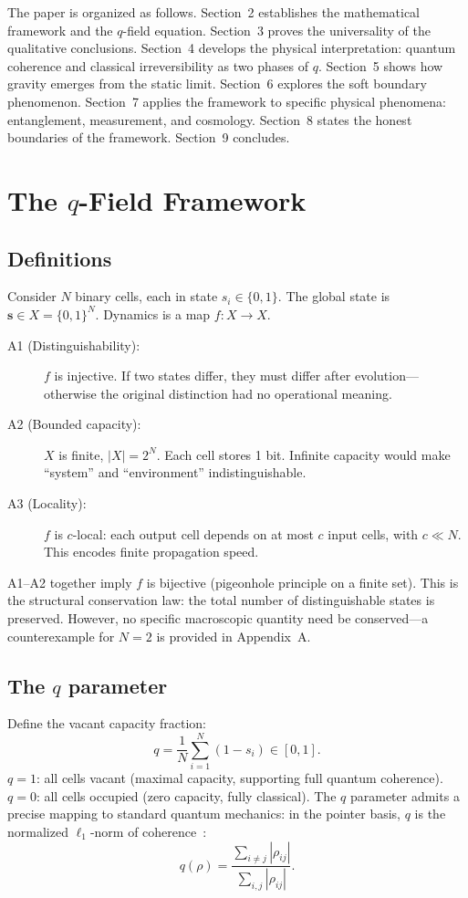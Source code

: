 \documentclass[12pt]{article}
\begin{document}
The paper is organized as follows. Section~2 establishes the mathematical framework and the $q$-field equation. Section~3 proves the universality of the qualitative conclusions. Section~4 develops the physical interpretation: quantum coherence and classical irreversibility as two phases of $q$. Section~5 shows how gravity emerges from the static limit. Section~6 explores the soft boundary phenomenon. Section~7 applies the framework to specific physical phenomena: entanglement, measurement, and cosmology. Section~8 states the honest boundaries of the framework. Section~9 concludes.

\section{The $q$-Field Framework}

\subsection{Definitions}

Consider $N$ binary cells, each in state $s_i\in\{0,1\}$. The global state is $\mathbf{s}\in X=\{0,1\}^N$. Dynamics is a map $f:X\to X$.

\begin{description}
\item[A1 (Distinguishability):] $f$ is injective. If two states differ, they must differ after evolution---otherwise the original distinction had no operational meaning.
\item[A2 (Bounded capacity):] $X$ is finite, $|X|=2^N$. Each cell stores 1 bit. Infinite capacity would make ``system'' and ``environment'' indistinguishable.
\item[A3 (Locality):] $f$ is $c$-local: each output cell depends on at most $c$ input cells, with $c\ll N$. This encodes finite propagation speed.
\end{description}

A1--A2 together imply $f$ is bijective (pigeonhole principle on a finite set). This is the structural conservation law: the total number of distinguishable states is preserved. However, no specific macroscopic quantity need be conserved---a counterexample for $N=2$ is provided in Appendix~A.

\subsection{The $q$ parameter}

Define the vacant capacity fraction:
\begin{equation}
q = \frac{1}{N}\sum_{i=1}^N (1-s_i) \in [0,1].
\end{equation}
$q=1$: all cells vacant (maximal capacity, supporting full quantum coherence). $q=0$: all cells occupied (zero capacity, fully classical). The $q$ parameter admits a precise mapping to standard quantum mechanics: in the pointer basis, $q$ is the normalized $\ell_1$-norm of coherence~\cite{Baumgratz2014}:
\begin{equation}
q(\rho) = \frac{\sum_{i\neq j}|\rho_{ij}|}{\sum_{i,j}|\rho_{ij}|}.
\end{equation}
\end{document}
